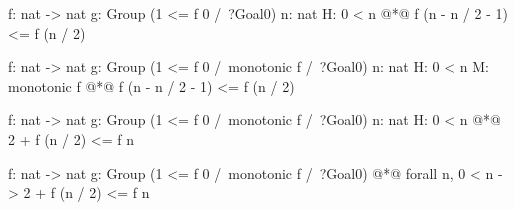 \begin{minipage}{0.45\textwidth}

\begin{adjustbox}{minipage={0.97\textwidth},fbox}
\begin{coql}
f: nat -> nat
g: Group (1 <= f 0 /\ ?Goal0)
n: nat
H: 0 < n
@*\grule*@
 f (n - n / 2 - 1) <= f (n / 2)
\end{coql}
\nointerlineskip%
\end{adjustbox}%

\vspace{0.3em}

\begin{adjustbox}{minipage={0.97\textwidth},fbox}
\begin{coql}
f: nat -> nat
g: Group (1 <= f 0 /\ monotonic f /\ ?Goal0)
n: nat
H: 0 < n
M: monotonic f
@*\grule*@
 f (n - n / 2 - 1) <= f (n / 2)
\end{coql}
\nointerlineskip%
\end{adjustbox}%

\vspace{0.3em}

\begin{adjustbox}{minipage={0.97\textwidth},fbox}
\begin{coql}
f: nat -> nat
g: Group (1 <= f 0 /\ monotonic f /\ ?Goal0)
n: nat
H: 0 < n
@*\grule*@
 2 + f (n / 2) <= f n
\end{coql}
\nointerlineskip%
\end{adjustbox}%

\vspace{0.3em}

\begin{adjustbox}{minipage={0.97\textwidth},fbox}
\begin{coql}
f: nat -> nat
g: Group (1 <= f 0 /\ monotonic f /\ ?Goal0)
@*\grule*@
 forall n, 0 < n -> 2 + f (n / 2) <= f n
\end{coql}
\nointerlineskip%
\end{adjustbox}%


\end{minipage}
